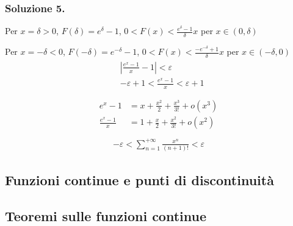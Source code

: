 \documentclass[letterpaper,10pt,italian]{jupyterBook}
\begin{document}
\subsubsection*{Soluzione 5.}

\sphinxAtStartPar
{}

\sphinxAtStartPar
Per \(x = \delta > 0\), \(F(\delta) = e^{\delta} - 1\), \(0 < F(x) < \frac{e^{\delta}-1}{\delta} x\) per \(x \in (0,\delta)\)

\sphinxAtStartPar
Per \(x = -\delta < 0\), \(F(-\delta) = e^{-\delta} - 1\), \(0 < F(x) < \frac{-e^{-\delta}+1}{\delta} x\) per \(x \in (-\delta, 0)\)
\begin{equation*}
\begin{split}\begin{aligned}
  & \left| \frac{e^x-1}{x} - 1 \right| < \varepsilon \\
  & -\varepsilon + 1 < \frac{e^x-1}{x} < \varepsilon + 1 \\
\end{aligned}\end{split}
\end{equation*}\begin{equation*}
\begin{split}\begin{aligned}
  e^{x} - 1 & = x + \frac{x^2}{2} + \frac{x^3}{3!} + o(x^3) \\
  \frac{e^{x} - 1}{x} & = 1 + \frac{x}{2} + \frac{x^2}{3!} + o(x^2) \\
\end{aligned}\end{split}
\end{equation*}\begin{equation*}
\begin{split}-\varepsilon < \sum_{n=1}^{+\infty} \frac{x^n}{(n+1)!} < \varepsilon\end{split}
\end{equation*}



\subsection{Funzioni continue e punti di discontinuità}
\label{\detokenize{ch/infinitesimal_calculus/analysis-problems:funzioni-continue-e-punti-di-discontinuita}}

\subsection{Teoremi sulle funzioni continue}
\label{\detokenize{ch/infinitesimal_calculus/analysis-problems:teoremi-sulle-funzioni-continue}}
\end{document}
